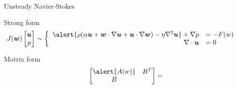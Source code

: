 \begin{frame}{Unsteady Navier-Stokes}
  \begin{block}{Strong form}
    \vspace{-1em}
    \begin{align*}
      J(\ww) \begin{bmatrix} \uu \\ p \end{bmatrix} &\sim \left\{
        \begin{array}{rl}
          \alert{\rho(\alpha \uu + \ww \cdot \nabla\uu + \uu\cdot\nabla\ww) - \eta \nabla^2 \uu} + \nabla p &= -F(w) \\
          \nabla\cdot \uu &= 0
        \end{array} \right.
    \end{align*}
  \end{block}
  \vspace{-1em}
  \begin{block}{Matrix form}
    \vspace{-1em}
    \[
    \begin{bmatrix} \alert{A(w)} & B^T \\ B & \end{bmatrix} =
\]
\end{block}
\end{frame}
